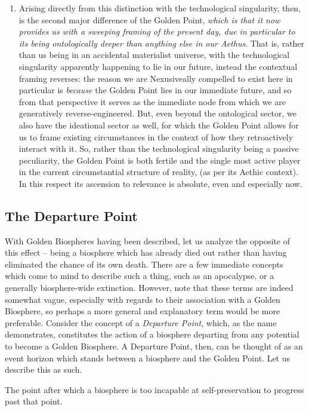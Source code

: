 \begin{enumerate}
    \item Arising directly from this distinction with the technological singularity, then, is the second major difference of the Golden Point, \textit{which is that it now provides us with a sweeping framing of the present day, due in particular to its being ontologically deeper than anything else in our Aethus}. That is, rather than us being in an accidental materialist universe, with the technological singularity apparently happening to lie in our future, instead the contextual framing reverses: the reason we are Nexusiveally compelled to exist here in particular is \textit{because} the Golden Point lies in our immediate future, and so from that perspective it serves as the immediate node from which we are generatively reverse-engineered. But, even beyond the ontological sector, we also have the ideational sector as well, for which the Golden Point allows for us to frame existing circumstances in the context of how they retroactively interact with it. So, rather than the technological singularity being a passive peculiarity, the Golden Point is both fertile and the single most active player in the current circumstantial structure of reality, (as per its Aethic context). In this respect its ascension to relevance is absolute, even and especially now. 
\end{enumerate}

\subsection{The Departure Point}

With Golden Biospheres having been described, let us analyze the opposite of this effect -- being a biosphere which has already died out rather than having eliminated the chance of its own death. There are a few immediate concepts which come to mind to describe such a thing, such as an apocalypse, or a generally biosphere-wide extinction. However, note that these terms are indeed somewhat vague, especially with regards to their association with a Golden Biosphere, so perhaps a more general and explanatory term would be more preferable. Consider the concept of a \textit{Departure Point}, which, as the name demonstrates, constitutes the action of a biosphere departing from any potential to become a Golden Biosphere. A Departure Point, then, can be thought of as an event horizon which stands between a biosphere and the Golden Point. Let us describe this as such. 

\begin{concept}
    The point after which a biosphere is too incapable at self-preservation to progress past that point. 
\end{concept}

